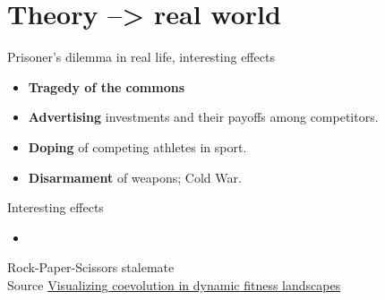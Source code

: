 \documentclass{beamer}
\begin{document}
\section{Theory --> real world}
\begin{frame}{Prisoner's dilemma in real life, interesting effects}
    \begin{itemize}
        \item \textbf{Tragedy of the commons}
        \item \textbf{Advertising} investments and their payoffs among competitors.
        \item \textbf{Doping} of competing athletes in sport.
        \item \textbf{Disarmament} of weapons; Cold War.
    \end{itemize}
\end{frame}

\begin{frame}{Interesting effects}
    \begin{itemize}
        \item 
    \end{itemize}
\end{frame}

\begin{frame}{Rock-Paper-Scissors stalemate}
    \\
    Source \href{https://www.youtube.com/watch?v=FTBUIJwlVBg}{Visualizing coevolution in dynamic fitness landscapes }

\end{frame}
\end{document}
